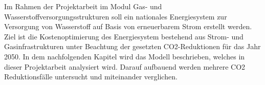Im Rahmen der Projektarbeit im Modul Gas- und Wasserstoffversorgungsstrukturen soll ein nationales Energiesystem zur Versorgung von Wasserstoff auf Basis von erneuerbarem Strom erstellt werden. Ziel ist die Kostenoptimierung des Energiesystem bestehend aus Strom- und Gasinfrastrukturen unter Beachtung der gesetzten CO2-Reduktionen für das Jahr 2050. In dem nachfolgenden Kapitel wird das Modell beschrieben, welches in dieser Projektarbeit analysiert wird. Darauf aufbauend werden mehrere CO2 Reduktionsfälle untersucht und miteinander verglichen.